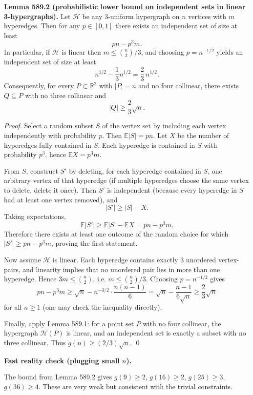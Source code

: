 \bigskip
\noindent\textbf{Lemma 589.2 (probabilistic lower bound on independent sets in linear 3-hypergraphs).}
Let $\mathcal{H}$ be any 3-uniform hypergraph on $n$ vertices with $m$ hyperedges.
Then for any $p\in[0,1]$ there exists an independent set of size at least
\[
 pn - p^3 m.
\]
In particular, if $\mathcal{H}$ is linear then $m\le \binom{n}{2}/3$, and choosing $p=n^{-1/2}$ yields an independent set of size at least
\[
 n^{1/2}-\frac{1}{3}n^{1/2}=\frac{2}{3}\,n^{1/2}.
\]
Consequently, for every $P\subset\mathbb{R}^2$ with $|P|=n$ and no four collinear, there exists $Q\subseteq P$ with no three collinear and
\[
|Q|\ge \frac{2}{3}\sqrt{n}.
\]

\noindent\emph{Proof.}
Select a random subset $S$ of the vertex set by including each vertex independently with probability $p$.
Then $\mathbb{E}|S|=pn$.
Let $X$ be the number of hyperedges fully contained in $S$.
Each hyperedge is contained in $S$ with probability $p^3$, hence $\mathbb{E}X=p^3 m$.

From $S$, construct $S'$ by deleting, for each hyperedge contained in $S$, one arbitrary vertex of that hyperedge (if multiple hyperedges choose the same vertex to delete, delete it once).
Then $S'$ is independent (because every hyperedge in $S$ had at least one vertex removed), and
\[
|S'|\ge |S|-X.
\]
Taking expectations,
\[
\mathbb{E}|S'|\ge \mathbb{E}|S|-\mathbb{E}X = pn - p^3 m.
\]
Therefore there exists at least one outcome of the random choice for which $|S'|\ge pn-p^3 m$, proving the first statement.

Now assume $\mathcal{H}$ is linear.
Each hyperedge contains exactly $3$ unordered vertex-pairs, and linearity implies that no unordered pair lies in more than one hyperedge.
Hence $3m\le \binom{n}{2}$, i.e. $m\le \binom{n}{2}/3$.
Choosing $p=n^{-1/2}$ gives
\[
 pn-p^3 m \ge \sqrt n - n^{-3/2}\cdot \frac{n(n-1)}{6} = \sqrt n - \frac{n-1}{6\sqrt n} \ge \frac{2}{3}\sqrt n
\]
for all $n\ge 1$ (one may check the inequality directly).

Finally, apply Lemma 589.1: for a point set $P$ with no four collinear, the hypergraph $\mathcal{H}(P)$ is linear, and an independent set is exactly a subset with no three collinear.
Thus $g(n)\ge (2/3)\sqrt n$.
\qed

\bigskip
\noindent\textbf{Fast reality check (plugging small $n$).}

The bound from Lemma 589.2 gives $g(9)\ge 2$, $g(16)\ge 2$, $g(25)\ge 3$, $g(36)\ge 4$.
These are very weak but consistent with the trivial constraints.

